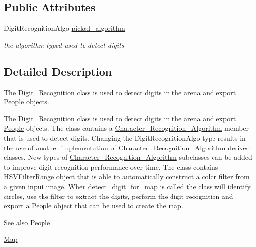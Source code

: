\subsection*{Public Attributes}
\begin{DoxyCompactItemize}
\item 
\mbox{\label{class_digit___recognition_aae57bd40fa8864ed5085beb98aa22fcd}} 
Digit\+Recognition\+Algo \mbox{\hyperlink{class_digit___recognition_aae57bd40fa8864ed5085beb98aa22fcd}{picked\+\_\+algorithm}}
\begin{DoxyCompactList}\small\item\em the algorithm typed used to detect digits \end{DoxyCompactList}\end{DoxyCompactItemize}


\subsection{Detailed Description}
The \mbox{\hyperlink{class_digit___recognition}{Digit\+\_\+\+Recognition}} class is used to detect digits in the arena and export \mbox{\hyperlink{class_people}{People}} objects. 

The \mbox{\hyperlink{class_digit___recognition}{Digit\+\_\+\+Recognition}} class is used to detect digits in the arena and export \mbox{\hyperlink{class_people}{People}} objects. The class contains a \mbox{\hyperlink{class_character___recognition___algorithm}{Character\+\_\+\+Recognition\+\_\+\+Algorithm}} member that is used to detect digits. Changing the Digit\+Recognition\+Algo type results in the use of another implementation of \mbox{\hyperlink{class_character___recognition___algorithm}{Character\+\_\+\+Recognition\+\_\+\+Algorithm}} derived classes. New types of \mbox{\hyperlink{class_character___recognition___algorithm}{Character\+\_\+\+Recognition\+\_\+\+Algorithm}} subclasses can be added to improve digit recognition performance over time. The class contains \mbox{\hyperlink{struct_h_s_v_filter_range}{H\+S\+V\+Filter\+Range}} object that is able to automatically construct a color filter from a given input image. When detect\+\_\+digit\+\_\+for\+\_\+map is called the class will identify circles, use the filter to extract the digits, perform the digit recognition and export a \mbox{\hyperlink{class_people}{People}} object that can be used to create the map. \begin{DoxySeeAlso}{See also}
\mbox{\hyperlink{class_people}{People}} 

\mbox{\hyperlink{class_map}{Map}} 
\end{DoxySeeAlso}


